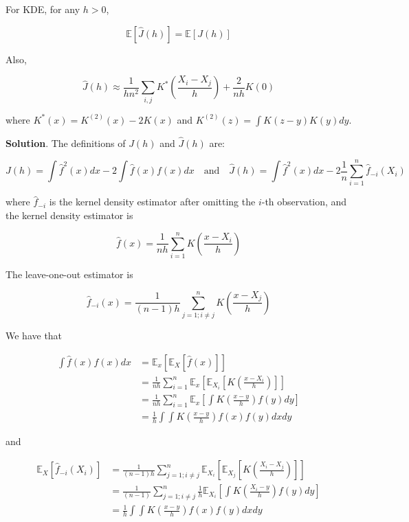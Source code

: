 For KDE, for any \(h > 0\),

\[ \mathbb{E} \left[ \hat{J}(h) \right] = \mathbb{E} \left[ J(h) \right] \]

Also,

\[ \hat{J}(h) \approx \frac{1}{hn^{2}}\sum_{i, j} K^* \left( \frac{X_{i} - X_{j}}{h} \right) + \frac{2}{nh} K(0) \]

where \(K^*(x) = K^{(2)}(x) - 2 K(x)\) and
\(K^{(2)}(z) = \int K(z - y) K(y) dy\).

\textbf{Solution}. The definitions of \(J(h)\) and \(\hat{J}(h)\) are:

\[ J(h) = \int \hat{f}^{2}(x) dx - 2 \int \hat{f}(x) f(x) dx 
\quad \text{and} \quad
\hat{J}(h) = \int \hat{f}^{2}(x) dx - 2 \frac{1}{n} \sum_{i=1}^{n} \hat{f}_{-i}(X_{i}) \]

where \(\hat{f}_{-i}\) is the kernel density estimator after omitting
the \(i\)-th observation, and the kernel density estimator is

\[ \hat{f}(x) = \frac{1}{nh} \sum_{i=1}^{n} K\left( \frac{x - X_{i}}{h} \right) \]

The leave-one-out estimator is

\[ \hat{f}_{-i}(x) = \frac{1}{(n - 1) h} \sum_{j=1; i \neq j}^{n} K \left( \frac{x - X_{j}}{h} \right) \]

We have that

\begin{align*}
\int \hat{f}(x) f(x) dx &=  \mathbb{E}_x \left[ \mathbb{E}_{X}\left[\hat{f}(x)\right] \right] \\
&= \frac{1}{nh} \sum_{i=1}^{n} \mathbb{E}_x\left[\mathbb{E}_{X_{i}}\left[K \left( \frac{x - X_{i}}{h} \right) \right] \right]  \\
&= \frac{1}{nh} \sum_{i=1}^{n} \mathbb{E}_x\left[ \int K \left( \frac{x - y}{h} \right) f(y) dy \right] \\
&= \frac{1}{h} \int \int K \left( \frac{x - y}{h} \right) f(x) f(y) dx  dy
\end{align*}

and

\begin{align*}
\mathbb{E}_X\left[ \hat{f}_{-i}(X_{i}) \right] &=
\frac{1}{(n - 1) h} \sum_{j=1; i \neq j}^{n} \mathbb{E}_{X_{i}}\left[ \mathbb{E}_{X_{j}}\left[ K \left( \frac{X_{i} - X_{j}}{h} \right) \right] \right] \\
&= \frac{1}{(n - 1)} \sum_{j=1; i \neq j}^{n} \frac{1}{h} \mathbb{E}_{X_{i}}\left[ \int K \left( \frac{X_{i} - y}{h} \right) f(y) dy \right] \\
& = \frac{1}{h} \int \int K \left( \frac{x - y}{h} \right) f(x) f(y) dx  dy
\end{align*}

